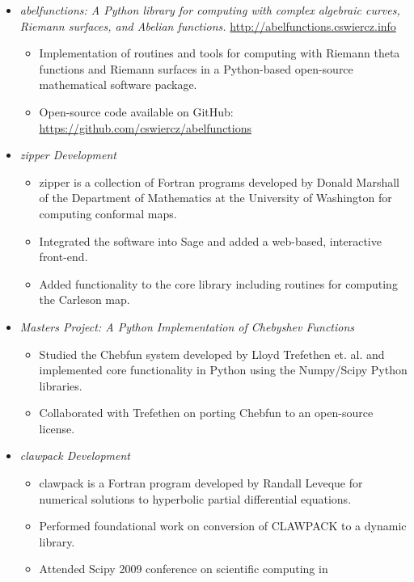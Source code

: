 \documentclass{article}
\begin{document}
\begin{itemize}
  \item {\it {\sc abelfunctions}: A Python library for computing with
    complex algebraic curves, Riemann surfaces, and Abelian functions.}
    \url{http://abelfunctions.cswiercz.info}
    \begin{itemize}
      \item Implementation of routines and tools for computing with
        Riemann theta functions and Riemann surfaces in a Python-based
        open-source mathematical software package.
      \item Open-source code available on GitHub:
        \url{https://github.com/cswiercz/abelfunctions}
    \end{itemize}
  \item {\it {\sc zipper} Development}
    \begin{itemize}
      \item {\sc zipper} is a collection of Fortran programs developed
        by Donald Marshall of the Department of Mathematics at the
        University of Washington for computing conformal maps.
      \item Integrated the software into Sage and added a web-based,
        interactive front-end.
      \item Added functionality to the core library including routines
        for computing the Carleson map.
    \end{itemize}
  \item {\it Masters Project: A Python Implementation of Chebyshev
    Functions}
    \begin{itemize}
      \item Studied the Chebfun system developed by Lloyd Trefethen
        et. al.  and implemented core functionality in Python using the
        Numpy/Scipy Python libraries.
      \item Collaborated with Trefethen on porting Chebfun to an
        open-source license.
    \end{itemize}
  \item {\it {\sc clawpack} Development}
    \begin{itemize}
      \item {\sc clawpack} is a Fortran program developed by Randall
        Leveque for numerical solutions to hyperbolic partial
        differential equations.
      \item Performed foundational work on conversion of CLAWPACK to a
        dynamic library.
      \item Attended Scipy 2009 conference on scientific computing in

\end{itemize}
\end{itemize}
\end{document}
